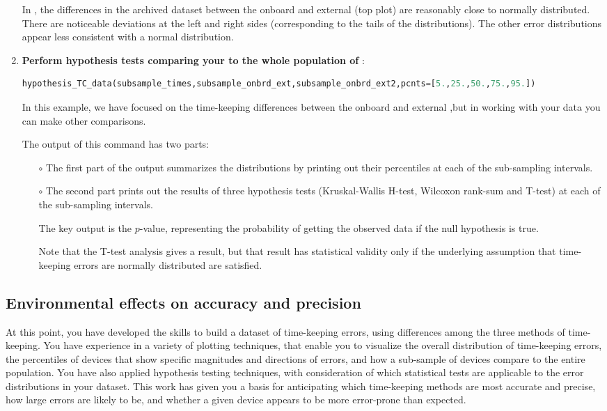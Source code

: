 \begin{enumerate}
	
	In , the differences in the archived dataset between the onboard and external \rtcs (top plot) are reasonably close to normally distributed.
	There are noticeable deviations at the left and right sides (corresponding to the tails of the distributions). 
	The other error distributions appear less consistent with a normal distribution.

	\item \textbf{Perform hypothesis tests comparing your \rtc to the whole population of \rtcs}:
\begin{lstlisting}[language=Python]
hypothesis_TC_data(subsample_times,subsample_onbrd_ext,subsample_onbrd_ext2,pcnts=[5.,25.,50.,75.,95.])
\end{lstlisting}
	In this example, we have focused on the time-keeping differences between the onboard and external \rtcs,but in working with your data you can make other comparisons.

	\smallskip
	The output of this command has two parts:
	\begin{itemize}
		\item[$\circ$] The first part of the output summarizes the distributions by printing out their percentiles at each of the sub-sampling intervals.
		\item[$\circ$] The second part prints out the results of three hypothesis tests (Kruskal-Wallis H-test, Wilcoxon rank-sum and T-test) at each of the sub-sampling intervals.
		
		\smallskip
		The key output is the $p$-value, representing the probability of getting the observed data if the null hypothesis is true.
		
		\smallskip
		Note that the T-test analysis gives a result, but that result has statistical validity only if the underlying assumption that time-keeping errors are normally distributed are satisfied.
	\end{itemize}

\end{enumerate}


\subsection{Environmental effects on \rtc accuracy and precision}
At this point, you have developed the skills to build a dataset of time-keeping errors, using differences among the three methods of time-keeping. 
You have experience in a variety of plotting techniques, that enable you to visualize the overall distribution of time-keeping errors, the percentiles of devices that show specific magnitudes and directions of errors, and how a sub-sample of devices compare to the entire population. 
You have also applied hypothesis testing techniques, with consideration of which statistical tests are applicable to the error distributions in your dataset.
This work has given you a basis for anticipating which time-keeping methods are most accurate and precise, how large errors are likely to be, and whether a given device appears to be more error-prone than expected.

